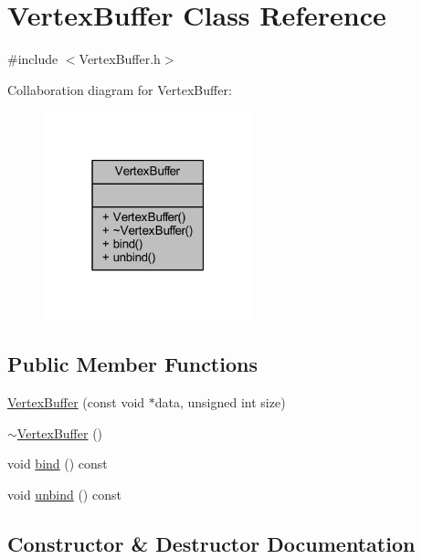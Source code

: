\hypertarget{class_vertex_buffer}{}\section{Vertex\+Buffer Class Reference}
\label{class_vertex_buffer}


{\ttfamily \#include $<$Vertex\+Buffer.\+h$>$}



Collaboration diagram for Vertex\+Buffer\+:
\nopagebreak
\begin{figure}[H]
\begin{center}
\leavevmode
\includegraphics[width=171pt]{class_vertex_buffer__coll__graph}
\end{center}
\end{figure}
\subsection*{Public Member Functions}
\begin{DoxyCompactItemize}
\item 
\mbox{\hyperlink{class_vertex_buffer_af8adb744d388d978af68035cf8254425}{Vertex\+Buffer}} (const void $\ast$data, unsigned int size)
\item 
\mbox{\hyperlink{class_vertex_buffer_a5216726fdd43b2ae8e1439e347717fdd}{$\sim$\+Vertex\+Buffer}} ()
\item 
void \mbox{\hyperlink{class_vertex_buffer_afc06aa70b14e2379e8565afb2e017bd2}{bind}} () const
\item 
void \mbox{\hyperlink{class_vertex_buffer_a85fad27f8f068b0610ff052a2a5496f1}{unbind}} () const
\end{DoxyCompactItemize}


\subsection{Constructor \& Destructor Documentation}
\mbox{\label{class_vertex_buffer_af8adb744d388d978af68035cf8254425}} 
